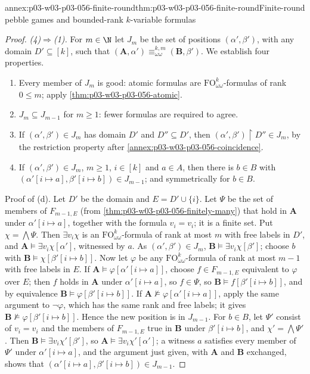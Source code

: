 \begin{annexitem}{annex:p03-w03-p03-056-finite-round}{thm:p03-w03-p03-056-finite-round}{Finite-round pebble games and bounded-rank \(k\)-variable formulas}
\begin{proof}
\emph{(4)\(\Rightarrow\)(1).} For \(m\in\N\) let \(J_m\) be the set of
positions \((\alpha',\beta')\), with any domain \(D'\subseteq[k]\), such that
\((\mathbf A,\alpha')\equiv^{k,m}_{\omega\omega}(\mathbf B,\beta')\). We
establish four properties.
\begin{enumerate}
\item[(a)] Every member of \(J_m\) is good: atomic formulas are
      \(\mathrm{FO}^k_{\omega\omega}\)-formulas of rank \(0\leq m\); apply
      \cref{thm:p03-w03-p03-056-atomic}.
\item[(b)] \(J_m\subseteq J_{m-1}\) for \(m\geq1\): fewer formulas are
      required to agree.
\item[(c)] If \((\alpha',\beta')\in J_m\) has domain \(D'\) and
      \(D''\subseteq D'\), then \((\alpha',\beta')\restriction D''\in J_m\),
      by the restriction property after
      \cref{annex:p03-w03-p03-056-coincidence}.
\item[(d)] If \((\alpha',\beta')\in J_m\), \(m\geq1\), \(i\in[k]\) and
      \(a\in A\), then there is \(b\in B\) with
      \((\alpha'[i\mapsto a],\beta'[i\mapsto b])\in J_{m-1}\); and
      symmetrically for \(b\in B\).
\end{enumerate}
Proof of (d). Let \(D'\) be the domain and \(E=D'\cup\{i\}\). Let \(\Psi\) be
the set of members of \(F_{m-1,E}\) (from
\cref{thm:p03-w03-p03-056-finitely-many}) that hold in \(\mathbf A\) under
\(\alpha'[i\mapsto a]\), together with the formula \(v_i=v_i\); it is a
finite set. Put \(\chi=\bigwedge\Psi\). Then \(\exists v_i\chi\) is an
\(\mathrm{FO}^k_{\omega\omega}\)-formula of rank at most \(m\) with free labels
in \(D'\), and \(\mathbf A\models\exists v_i\chi[\alpha']\), witnessed by
\(a\). As \((\alpha',\beta')\in J_m\),
\(\mathbf B\models\exists v_i\chi[\beta']\); choose \(b\) with
\(\mathbf B\models\chi[\beta'[i\mapsto b]]\). Now let \(\varphi\) be any
\(\mathrm{FO}^k_{\omega\omega}\)-formula of rank at most \(m-1\) with free
labels in \(E\). If \(\mathbf A\models\varphi[\alpha'[i\mapsto a]]\), choose
\(f\in F_{m-1,E}\) equivalent to \(\varphi\) over \(E\); then \(f\) holds in
\(\mathbf A\) under \(\alpha'[i\mapsto a]\), so \(f\in\Psi\), so
\(\mathbf B\models f[\beta'[i\mapsto b]]\), and by equivalence
\(\mathbf B\models\varphi[\beta'[i\mapsto b]]\). If
\(\mathbf A\not\models\varphi[\alpha'[i\mapsto a]]\), apply the same
argument to \(\neg\varphi\), which has the same rank and free labels; it
gives \(\mathbf B\not\models\varphi[\beta'[i\mapsto b]]\). Hence the new
position is in \(J_{m-1}\). For \(b\in B\), let \(\Psi'\) consist of
\(v_i=v_i\) and the members of \(F_{m-1,E}\) true in \(\mathbf B\) under
\(\beta'[i\mapsto b]\), and \(\chi'=\bigwedge\Psi'\). Then
\(\mathbf B\models\exists v_i\chi'[\beta']\), so
\(\mathbf A\models\exists v_i\chi'[\alpha']\); a witness \(a\) satisfies
every member of \(\Psi'\) under \(\alpha'[i\mapsto a]\), and the argument
just given, with \(\mathbf A\) and \(\mathbf B\) exchanged, shows that
\((\alpha'[i\mapsto a],\beta'[i\mapsto b])\in J_{m-1}\).


\end{proof}
\end{annexitem}
